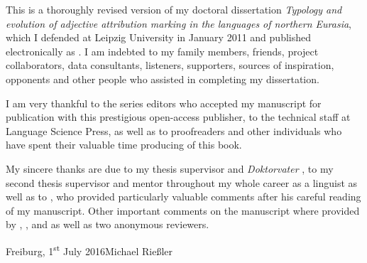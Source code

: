 

This is a thoroughly revised version of my doctoral dissertation \textit{Typology and evolution of adjective attribution marking in the languages of northern Eurasia}, which I defended at Leipzig University in January 2011 and published electronically as \citet{riesler2011a}. I am indebted to my family members, friends, project collaborators, data consultants, listeners, supporters, sources of inspiration, opponents and other people who assisted in completing my dissertation. 

I am very thankful to the series editors who accepted my manuscript for publication with this prestigious open-access publisher, to the technical staff at Language Science Press, as well as to proofreaders and other individuals who have spent their valuable time producing of this book. 

My sincere thanks are due to my thesis supervisor and \emph{Doktorvater} , to my second thesis supervisor and mentor throughout my whole career as a linguist  as well as to , who provided particularly valuable comments after his careful reading of my manuscript. Other important comments on the manuscript where provided by , ,  and  as well as two anonymous reviewers.

\bigskip

\noindent
Freiburg, 1\textsuperscript{st} July 2016\hfill Michael Rießler
